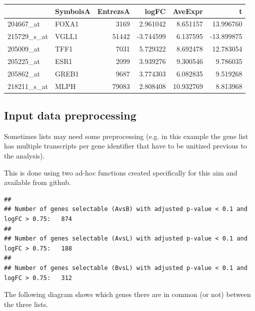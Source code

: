 \documentclass{article}\usepackage[]{graphicx}\usepackage[]{color}
\makeatletter
\newenvironment{kframe}{%
 \def\at@end@of@kframe{}%
 \ifinner\ifhmode%
  \def\at@end@of@kframe{\end{minipage}}%
  \begin{minipage}{\columnwidth}%
 \fi\fi%
 \def\FrameCommand##1{\hskip\@totalleftmargin \hskip-\fboxsep
 \colorbox{shadecolor}{##1}\hskip-\fboxsep
     \hskip-\linewidth \hskip-\@totalleftmargin \hskip\columnwidth}%
 \MakeFramed {\advance\hsize-\width
   \@totalleftmargin\z@ \linewidth\hsize
   \@setminipage}}%
 {\par\unskip\endMakeFramed%
 \at@end@of@kframe}
\newenvironment{knitrout}{}{} %
\makeatother
\begin{document}
\begin{knitrout}
\begin{tabular}{l|l|r|r|r|r}
\hline
  & SymbolsA & EntrezsA & logFC & AveExpr & t\\
\hline
204667\_at & FOXA1 & 3169 & 2.961042 & 8.651157 & 13.996760\\
\hline
215729\_s\_at & VGLL1 & 51442 & -3.744599 & 6.137595 & -13.899875\\
\hline
205009\_at & TFF1 & 7031 & 5.729322 & 8.692478 & 12.783054\\
\hline
205225\_at & ESR1 & 2099 & 3.939276 & 9.300546 & 9.786035\\
\hline
205862\_at & GREB1 & 9687 & 3.774303 & 6.082835 & 9.519268\\
\hline
218211\_s\_at & MLPH & 79083 & 2.808408 & 10.932769 & 8.813968\\
\hline
\end{tabular}
\end{knitrout}

\subsection{Input data preprocessing}

Sometimes lists may need some preprocessing (e.g. in this example the gene list has multiple transcripts per gene identifier that have to be unitized previous to the analysis).

This is done using two ad-hoc functions created specifically for this aim and available from github. 

\begin{knitrout}
\color{fgcolor}\begin{kframe}
\begin{verbatim}
## 
## Number of genes selectable (AvsB) with adjusted p-value < 0.1 and logFC > 0.75:	 874
## 
## Number of genes selectable (AvsL) with adjusted p-value < 0.1 and logFC > 0.75:	 188
## 
## Number of genes selectable (BvsL) with adjusted p-value < 0.1 and logFC > 0.75:	 312
\end{verbatim}
\end{kframe}
\end{knitrout}

The following diagram shows which genes there are in common (or not) between the three lists.
\end{document}
